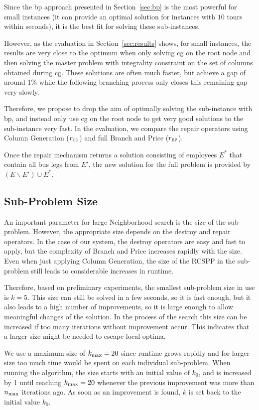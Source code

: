 \documentclass[]{amsart}
\newcommand{\size}{k}
\newcommand{\maxiter}{n_\textup{max}}
\newcommand{\rbp}{$r_\textsc{bp}$\xspace}
\newcommand{\rcg}{$r_\textsc{cg}$\xspace}
\theoremstyle{plain}
\begin{document}
Since the \acrfull{bp} approach presented in Section~\ref{sec:bp} is the most powerful for small instances (it can provide an optimal solution for instances with $10$ tours within seconds), it is the best fit for solving these sub-instances.

However, as the evaluation in Section~\ref{sec:results} shows, for small instances, the results are very close to the optimum when only solving \acrfull{cg} on the root node and then solving the master problem with integrality constraint on the set of columns obtained during \gls{cg}. These solutions are often much faster, but achieve a gap of around 1\% while the following branching process only closes this remaining gap very slowly.

Therefore, we propose to drop the aim of optimally solving the sub-instance with \gls{bp}, and instead only use \gls{cg} on the root node to get very good solutions to the sub-instance very fast. In the evaluation, we compare the repair operators using Column Generation (\rcg) and full Branch and Price (\rbp).

Once the repair mechanism returns a solution consisting of employees $E^*$ that contain all bus legs from $E'$, the new solution for the full problem is provided by $(E\backslash E')\cup E^*$.

\subsection{Sub-Problem Size}

An important parameter for large Neighborhood search is the size of the sub-problem. However, the appropriate size depends on the destroy and repair operators. In the case of our system, the destroy operators are easy and fast to apply, but the complexity of Branch and Price increases rapidly with the size. Even when just applying Column Generation, the size of the RCSPP in the sub-problem still leads to considerable increases in runtime.

Therefore, based on preliminary experiments, the smallest sub-problem size in use is $\size=5$. This size can still be solved in a few seconds, so it is fast enough, but it also leads to a high number of improvements, so it is large enough to allow meaningful changes of the solution. In the process of the search this size can be increased if too many iterations without improvement occur. This indicates that a larger size might be needed to escape local optima.

We use a maximum size of $\size_{\textup{max}} = 20$ since runtime grows rapidly and for larger size too much time would be spent on each individual sub-problem. When running the algorithm, the size starts with an initial value of $\size_0$, and is increased by 1 until reaching $\size_{\textup{max}} = 20$ whenever the previous improvement was more than $\maxiter$ iterations ago. As soon as an improvement is found, $\size$ is set back to the initial value $\size_0$.
\end{document}
